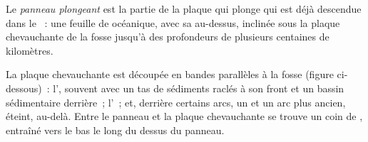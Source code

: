 \begin{definition}\label{def:b1:active-margins:slab}
Le \emph{panneau plongeant} est la partie de la plaque
qui plonge qui est déjà descendue dans le ~: une feuille de  océanique,
avec sa  au-dessus, inclinée sous la plaque chevauchante de
la fosse jusqu'à des profondeurs de plusieurs centaines de kilomètres.
\end{definition}

La plaque chevauchante est découpée en bandes parallèles à la fosse
(figure ci-dessous)~: l', souvent avec un tas de
sédiments raclés à son front et un bassin sédimentaire derrière~; l'~; et, derrière certains arcs, un  et un arc plus ancien, éteint,
au-delà. Entre le panneau et la plaque chevauchante se trouve un coin de
, entraîné vers le bas le long du dessus du panneau.

